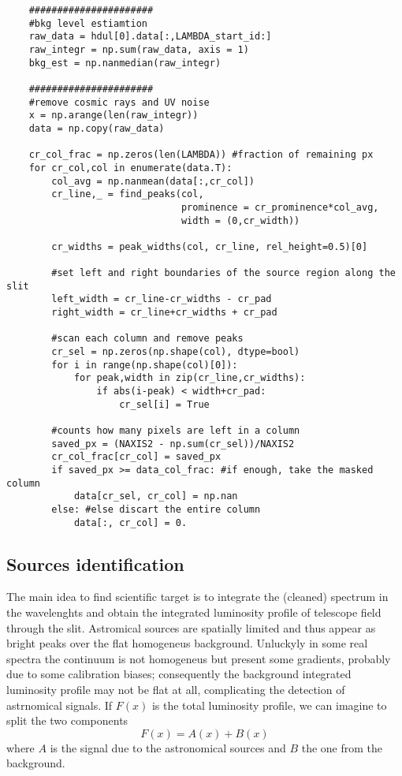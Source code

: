 \begin{lstlisting}
	######################
	#bkg level estiamtion
	raw_data = hdul[0].data[:,LAMBDA_start_id:]
	raw_integr = np.sum(raw_data, axis = 1)
	bkg_est = np.nanmedian(raw_integr)  
	
	######################
	#remove cosmic rays and UV noise
	x = np.arange(len(raw_integr)) 
	data = np.copy(raw_data)
	
	cr_col_frac = np.zeros(len(LAMBDA)) #fraction of remaining px
	for cr_col,col in enumerate(data.T):
		col_avg = np.nanmean(data[:,cr_col])
		cr_line,_ = find_peaks(col,
							   prominence = cr_prominence*col_avg,
							   width = (0,cr_width))
	
		cr_widths = peak_widths(col, cr_line, rel_height=0.5)[0]
	
		#set left and right boundaries of the source region along the slit
		left_width = cr_line-cr_widths - cr_pad
		right_width = cr_line+cr_widths + cr_pad
	
		#scan each column and remove peaks
		cr_sel = np.zeros(np.shape(col), dtype=bool)
		for i in range(np.shape(col)[0]):
			for peak,width in zip(cr_line,cr_widths):
				if abs(i-peak) < width+cr_pad:
					cr_sel[i] = True
	
		#counts how many pixels are left in a column
		saved_px = (NAXIS2 - np.sum(cr_sel))/NAXIS2
		cr_col_frac[cr_col] = saved_px
		if saved_px >= data_col_frac: #if enough, take the masked column
			data[cr_sel, cr_col] = np.nan
		else: #else discart the entire column
			data[:, cr_col] = 0.
\end{lstlisting}

\subsection{Sources identification}
The main idea to find scientific target is to integrate the (cleaned) spectrum in the wavelenghts and obtain the integrated luminosity profile of telescope field through the slit. Astromical sources are spatially limited and thus appear as bright peaks over the flat homogeneus background. Unluckyly in some real spectra the continuum is not homogeneus but present some gradients, probably due to some calibration biases; consequently the background integrated luminosity profile may not be flat at all, complicating the detection of astrnomical signals. If $F(x)$ is the total luminosity profile, we can imagine to split the two components
\begin{equation}
	F(x)=A(x)+B(x)
\end{equation}
where $A$ is the signal due to the astronomical sources and $B$ the one from the background.

